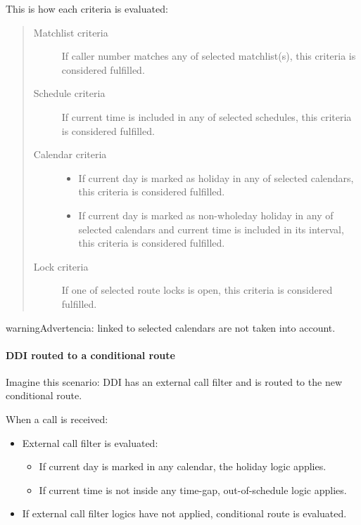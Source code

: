 \documentclass[letterpaper,10pt,spanish]{sphinxmanual}
\begin{document}
This is how each criteria is evaluated:
\begin{quote}
\begin{description}
\item[{Matchlist criteria}] \leavevmode
If caller number matches any of selected matchlist(s), this criteria is considered fulfilled.

\item[{Schedule criteria}] \leavevmode
If current time is included in any of selected schedules, this criteria is considered fulfilled.

\item[{Calendar criteria}] \leavevmode\begin{itemize}
\item {} 
If current day is marked as holiday in any of selected calendars, this criteria is considered fulfilled.

\item {} 
If current day is marked as non-wholeday holiday in any of selected calendars and current time is included
in its interval, this criteria is considered fulfilled.

\end{itemize}

\item[{Lock criteria}] \leavevmode
If one of selected route locks is open, this criteria is considered fulfilled.

\end{description}
\end{quote}

\begin{notice}{warning}{Advertencia:}
{\hyperref[administration_portal/client/vpbx/routing_tools/calendars:calendar\string-periods]{}} linked to selected calendars are not taken into account.
\end{notice}


\paragraph{DDI routed to a conditional route}
\label{administration_portal/client/vpbx/routing_endpoints/conditional_routes:ddi-routed-to-a-conditional-route}
Imagine this scenario: DDI has an external call filter and is routed to the new conditional route.

When a call is received:
\begin{itemize}
\item {} 
External call filter is evaluated:
\begin{itemize}
\item {} 
If current day is marked in any calendar, the holiday logic applies.

\item {} 
If current time is not inside any time-gap, out-of-schedule logic applies.

\end{itemize}

\item {} 
If external call filter logics have not applied, conditional route is evaluated.

\end{itemize}
\end{document}
